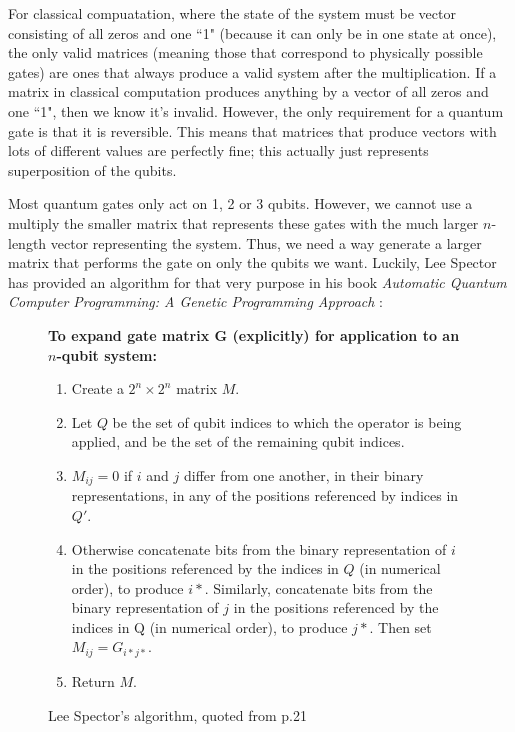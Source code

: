 \documentclass[11pt]{article}
\begin{document}
For classical compuatation, where the state of the system must be vector consisting of all zeros and one ``1" (because it can only be in one state at once), the only valid matrices (meaning those that correspond to physically possible gates) are ones that always produce a valid system after the multiplication. If a matrix in classical computation produces anything by a vector of all zeros and one ``1", then we know it's invalid. However, the only requirement for a quantum gate is that it is reversible. This means that matrices that produce vectors with lots of different values are perfectly fine; this actually just represents superposition of the qubits.

Most quantum gates only act on 1, 2 or 3 qubits. However, we cannot use a multiply the smaller matrix that represents these gates with the much larger $n$-length vector representing the system. Thus, we need a way generate a larger matrix that performs the gate on only the qubits we want. Luckily, Lee Spector has provided an algorithm for that very purpose in his book \textit{Automatic Quantum Computer Programming: A Genetic Programming Approach} \cite{spector04}:

\begin{figure}[h]
\begin{framed}
\textbf{To expand gate matrix G (explicitly) for application to an $n$-qubit system:}
\begin{enumerate}
\item Create a $2^{n} \times 2^{n}$ matrix $M$.
\item Let $Q$ be the set of qubit indices to which the operator is
being applied, and be the set of the remaining qubit
indices.
\item $M_{ij}=0$ if $i$ and $j$ differ from one another, in their binary representations, in any of the positions referenced by indices in $Q'$.
\item Otherwise concatenate bits from the binary representation of $i$ in the positions referenced by the indices in $Q$ (in numerical order), to produce $i*$. Similarly, concatenate bits from the binary representation of $j$ in the positions referenced by the indices in Q (in numerical order), to
produce $j*$. Then set $M_{ij}=G_{i*j*}$.
\item Return $M$.
\end{enumerate}
\end{framed}
\caption{Lee Spector's algorithm, quoted from p.21}
\end{figure}
\end{document}
